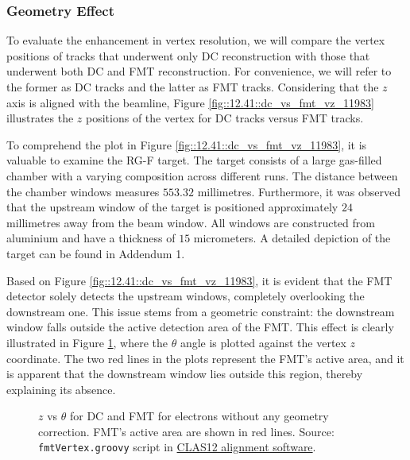\subsubsection{Geometry Effect}
\label{12.42::geometry_effect}
    To evaluate the enhancement in vertex resolution, we will compare the vertex positions of tracks that underwent only DC reconstruction with those that underwent both DC and FMT reconstruction.
    For convenience, we will refer to the former as DC tracks and the latter as FMT tracks.
    Considering that the $z$ axis is aligned with the beamline, Figure \ref{fig::12.41::dc_vs_fmt_vz_11983} illustrates the $z$ positions of the vertex for DC tracks versus FMT tracks.

    To comprehend the plot in Figure \ref{fig::12.41::dc_vs_fmt_vz_11983}, it is valuable to examine the RG-F target.
    The target consists of a large gas-filled chamber with a varying composition across different runs.
    The distance between the chamber windows measures $553.32$ millimetres.
    Furthermore, it was observed that the upstream window of the target is positioned approximately $24$ millimetres away from the beam window.
    All windows are constructed from aluminium and have a thickness of $15$ micrometers.
    A detailed depiction of the target can be found in Addendum 1.

    Based on Figure \ref{fig::12.41::dc_vs_fmt_vz_11983}, it is evident that the FMT detector solely detects the upstream windows, completely overlooking the downstream one.
    This issue stems from a geometric constraint: the downstream window falls outside the active detection area of the FMT.
    This effect is clearly illustrated in Figure \ref{eq::12.42::vz_vs_theta}, where the $\theta$ angle is plotted against the vertex $z$ coordinate.
    The two red lines in the plots represent the FMT's active area, and it is apparent that the downstream window lies outside this region, thereby explaining its absence.

    \begin{figure}[t!]
        \centering{}
        \caption[$z$ vs $\theta$ for DC and FMT.]{$z$ vs $\theta$ for DC and FMT for electrons without any geometry correction. FMT's active area are shown in red lines.
        Source: \texttt{fmtVertex.groovy} script in \hyperlink{github.com/JeffersonLab/clas12alignment}{CLAS12 alignment software}.}
        \label{eq::12.42::vz_vs_theta}
    \end{figure}

